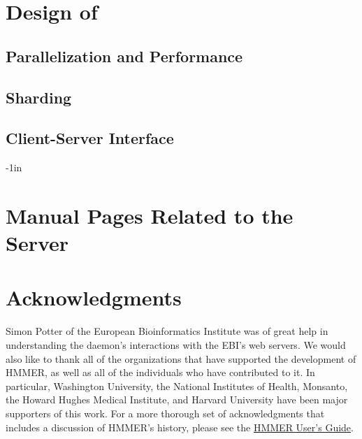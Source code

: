 \documentclass[notoc,justified]{tufte-book}    %
\newcommand{\Hmmserver}{\mono{Hmmserver}}
\begin{document}
\chapter{Design of \Hmmserver}
\section{Parallelization and Performance}
\section{Sharding}
\section{Client-Server Interface}

\begin{adjustwidth}{}{-1in}   
\chapter{Manual Pages Related to the Server}

\end{adjustwidth}

\chapter{Acknowledgments}
Simon Potter of the European Bioinformatics Institute was of great help in understanding the daemon's interactions with the EBI's web servers.  We would also like to thank all of the organizations that have supported the development of HMMER, as well as all of the individuals who have contributed to it. In particular, Washington University, the National Institutes of Health, Monsanto, the Howard Hughes Medical Institute, and Harvard University have been major supporters of this work.  For a more thorough set of acknowledgments that includes a discussion of HMMER's history, please see the \underline{HMMER User's Guide}.

\label{manualend}

% 
\end{document}
